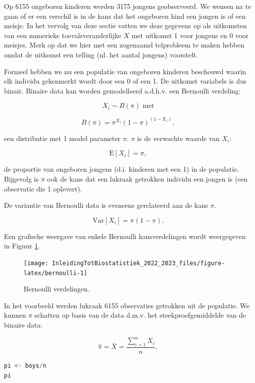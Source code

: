 \documentclass[
  12pt,dutch,coursenotes]{book}
\begin{document}
Op 6155 ongeboren kinderen werden 3175 jongens
geobserveerd.
We wensen na te gaan of er een verschil is in de kans dat het ongeboren kind een jongen is of een meisje.
In het vervolg van deze sectie vatten we deze gegevens op als uitkomsten van een numerieke toevalsveranderlijke \(X\) met uitkomst 1 voor jongens en 0 voor meisjes.
Merk op dat we hier met een zogenaamd telprobleem te maken hebben omdat de uitkomst een telling (nl. het aantal jongens) voorstelt.

Formeel hebben we nu een populatie van ongeboren kinderen beschouwd
waarin elk individu gekenmerkt wordt door een 0 of een 1.
De uitkomst variabele is dus binair.
Binaire data kan worden gemodelleerd a.d.h.v. een Bernoulli verdeling:

\[X_i \sim B(\pi) \text{ met}\]

\[B(\pi)=\pi^{X_i}(1-\pi)^{(1-X_i)},\]

een distributie met 1 model parameter \(\pi\).
\(\pi\) is de verwachte waarde van \(X_i\):

\[\text{E}[X_i]=\pi,\]

de proportie van ongeboren jongens (d.i. kinderen met een 1) in
de populatie.
Bijgevolg is \(\pi\) ook de kans dat een lukraak getrokken individu een jongen is (een observatie die 1 oplevert).

De variantie van Bernoulli data is eveneens gerelateerd aan de kans \(\pi\).

\[\text{Var}[X_i]=\pi (1-\pi).\]

Een grafische weergave van enkele Bernoulli kansverdelingen wordt weergegeven in Figuur \ref{fig:bernoulli}.

\begin{figure}

{\centering \texttt{[image: InleidingTotBiostatistiek\_2022\_2023\_files/figure-latex/bernoulli-1]} 

}

\caption{Bernoulli verdelingen.}\label{fig:bernoulli}
\end{figure}

In het voorbeeld werden lukraak
6155 observaties getrokken uit de populatie.
We kunnen \(\pi\) schatten op basis van de data d.m.v. het steekproefgemiddelde van de binaire data:

\[\hat \pi = \bar X = \frac{\sum\limits_{i=1}^n X_i}{n},\]

\begin{lstlisting}[language=R]
pi <- boys/n
pi
\end{lstlisting}
\end{document}
